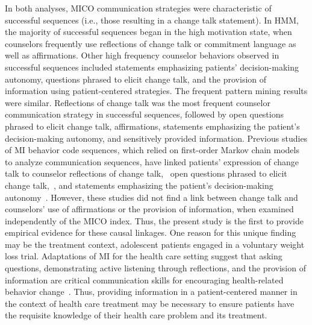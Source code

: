 In both analyses, MICO communication strategies were characteristic of successful sequences (i.e., those resulting in a change talk statement). In HMM, the majority of successful sequences began in the high motivation state, when counselors frequently use reflections of change talk or commitment language as well as affirmations. Other high frequency counselor behaviors observed in successful sequences included statements emphasizing patients’ decision-making autonomy, questions phrased to elicit change talk, and the provision of information using patient-centered strategies. The frequent pattern mining results were similar. Reflections of change talk was the most frequent counselor communication strategy in successful sequences, followed by open questions phrased to elicit change talk, affirmations, statements emphasizing the patient’s decision-making autonomy, and sensitively provided information. Previous studies of MI behavior code sequences, which relied on first-order Markov chain models to analyze communication sequences, have linked patients’ expression of change talk to counselor reflections of change talk,~\cite{moyers2009session, gaume2010counselor, glynn2014change, carcone2013provider, jacques2016building} open questions phrased to elicit change talk,~\cite{moyers2009session, carcone2013provider, jacques2016building}, and statements emphasizing the patient’s decision-making autonomy~\cite{carcone2013provider, jacques2016building}. However, these studies did not find a link between change talk and counselors’ use of affirmations or the provision of information, when examined independently of the MICO index. Thus, the present study is the first to provide empirical evidence for these causal linkages. One reason for this unique finding may be the treatment context, adolescent patients engaged in a voluntary weight loss trial. Adaptations of MI for the health care setting suggest that asking questions, demonstrating active listening through reflections, and the provision of information are critical communication skills for encouraging health-related behavior change~\cite{douaihy2015motivational}. Thus, providing information in a patient-centered manner in the context of health care treatment may be necessary to ensure patients have the requisite knowledge of their health care problem and its treatment. 

